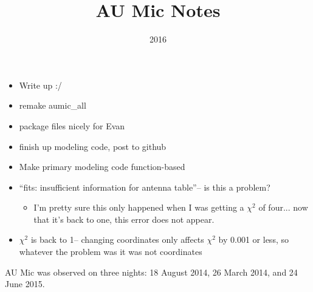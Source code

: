 \documentclass[a4paper]{tufte-handout}
\title{AU Mic Notes}
\date{2016}
\begin{document}
\maketitle


\begin{tasks}
    \begin{itemize}
      \item Write up :/
      \item remake aumic\_all
      \item package files nicely for Evan
      \item finish up modeling code, post to github
    \end{itemize}
\end{tasks}


\begin{maybe}
    \begin{itemize}
      \item Make primary modeling code function-based
    \end{itemize}
\end{maybe}


\begin{mer}
    \begin{itemize}
      \item ``fits: insufficient information for antenna table''-- is this a problem?
      \begin{itemize}
        \item I'm pretty sure this only happened when I was getting a $\chi^2$ of four... now that it's back to one, this error does not appear.
      \end{itemize}
      \item $\chi^2$ is back to 1-- changing coordinates only affects $\chi^2$ by 0.001 or less, so whatever the problem was it was not coordinates
    \end{itemize}

\end{mer}

AU Mic was observed on three nights: 18 August 2014, 26 March 2014, and 24 June 2015.

\hrulefill
\end{document}
